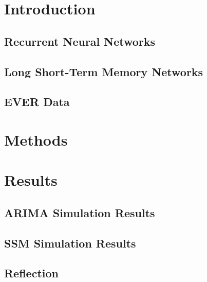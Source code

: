 \documentclass[12pt]{article}
\begin{document}


\tableofcontents
\newpage


\section{Introduction}\label{sec:intro}

\subsection{Recurrent Neural Networks}
 
\subsection{Long Short-Term Memory Networks}

\subsection{EVER Data}\label{sec:EVER}

%
\section{Methods}\label{sec:methods}

%
\section{Results}\label{sec:results}

\subsection{ARIMA Simulation Results}

\subsection{SSM Simulation Results}

\subsection{Reflection}



\newpage



\end{document}
